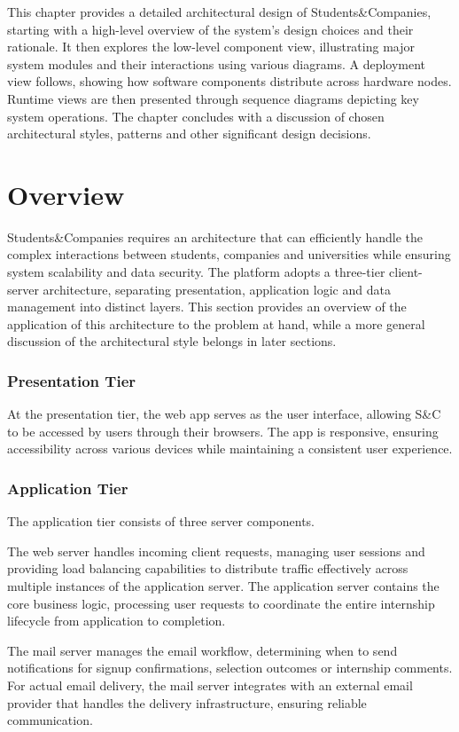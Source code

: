 This chapter provides a detailed architectural design of Students\&Companies, starting with a high-level overview of the system's design choices and their rationale.
It then explores the low-level component view, illustrating major system modules and their interactions using various diagrams.
A deployment view follows, showing how software components distribute across hardware nodes.
Runtime views are then presented through sequence diagrams depicting key system operations.
The chapter concludes with a discussion of chosen architectural styles, patterns and other significant design decisions.

\section{Overview}
Students\&Companies requires an architecture that can efficiently handle the complex interactions between students, companies and universities while ensuring system scalability and data security.
The platform adopts a three-tier client-server architecture, separating presentation, application logic and data management into distinct layers.
This section provides an overview of the application of this architecture to the problem at hand, while a more general discussion of the architectural style belongs in later sections.

\subsubsection{Presentation Tier}
At the presentation tier, the web app serves as the user interface, allowing S\&C to be accessed by users through their browsers.
The app is responsive, ensuring accessibility across various devices while maintaining a consistent user experience.

\subsubsection{Application Tier}
The application tier consists of three server components.

The web server handles incoming client requests, managing user sessions and providing load balancing capabilities to distribute traffic effectively across multiple instances of the application server.
The application server contains the core business logic, processing user requests to coordinate the entire internship lifecycle from application to completion.

The mail server manages the email workflow, determining when to send notifications for signup confirmations, selection outcomes or internship comments.
For actual email delivery, the mail server integrates with an external email provider that handles the delivery infrastructure, ensuring reliable communication.

